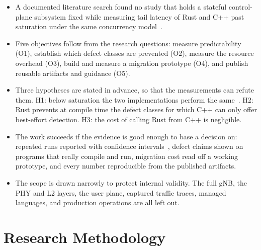 \documentclass[english,twoside,openright,a4paper,censored,csm,software-track-2020]{HYthesisML}
\begin{document}
\begin{itemize}
  \item A documented literature search found no study that holds a stateful control-plane
        subsystem fixed while measuring tail latency of Rust and C++ past saturation under the
        same concurrency model~\cite{karlback2021ran,arvidsson2025async}.
  \item Five objectives follow from the research questions: measure predictability (O1),
        establish which defect classes are prevented (O2), measure the resource overhead (O3),
        build and measure a migration prototype (O4), and publish reusable artifacts and
        guidance (O5).
  \item Three hypotheses are stated in advance, so that the measurements can refute them. H1:
        below saturation the two implementations perform the same~\cite{emmerich2019drivers}.
        H2: Rust prevents at compile time the defect classes for which C++ can only offer
        best-effort detection. H3: the cost of calling Rust from C++ is negligible.
  \item The work succeeds if the evidence is good enough to base a decision on: repeated runs
        reported with confidence intervals~\cite{georges2007rigorous}, defect claims shown on
        programs that really compile and run, migration cost read off a working prototype, and
        every number reproducible from the published artifacts.
  \item The scope is drawn narrowly to protect internal validity. The full gNB, the PHY and L2
        layers, the user plane, captured traffic traces, managed languages, and production
        operations are all left out.
\end{itemize}

\chapter{Research Methodology\label{chapter:methodology}}
\end{document}
